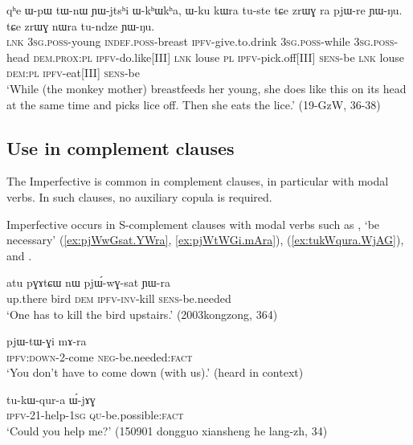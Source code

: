 \begin{exe}
\ex \label{ex:YWjtshi.WkhWkha}
\gll qʰe ɯ-pɯ tɯ-nɯ ɲɯ-jtsʰi ɯ-kʰɯkʰa,  ɯ-ku kɯra tu-ste tɕe zrɯɣ ra pjɯ-re ɲɯ-ŋu.  tɕe zrɯɣ nɯra tu-ndze ɲɯ-ŋu. \\
\textsc{lnk} \textsc{3sg}.\textsc{poss}-young \textsc{indef}.\textsc{poss}-breast \textsc{ipfv}-give.to.drink \textsc{3sg}.\textsc{poss}-while \textsc{3sg}.\textsc{poss}-head \textsc{dem}.\textsc{prox}:\textsc{pl} \textsc{ipfv}-do.like[III] \textsc{lnk} louse \textsc{pl} \textsc{ipfv}-pick.off[III] \textsc{sens}-be \textsc{lnk} louse \textsc{dem}:\textsc{pl} \textsc{ipfv}-eat[III] \textsc{sens}-be \\
\glt `While (the monkey mother) breastfeeds her young, she does like this on its head at the same time and picks lice off. Then she eats the lice.' (19-GzW, 36-38)
\end{exe}

\subsection{Use in complement clauses} \label{sec:ipfv.complement}
The Imperfective is common in complement clauses, in particular with modal verbs. In such clauses, no auxiliary copula is required.

Imperfective occurs in S-complement clauses with modal verbs such as , `be necessary' (\ref{ex:pjWwGsat.YWra}, \ref{ex:pjWtWGi.mAra}),  (\ref{ex:tukWqura.WjAG}),  and . 

\begin{exe}
\ex \label{ex:pjWwGsat.YWra}
\gll  atu pɣɤtɕɯ nɯ pjɯ́-wɣ-sat ɲɯ-ra \\
up.there bird \textsc{dem} \textsc{ipfv}-\textsc{inv}-kill \textsc{sens}-be.needed \\
\glt `One has to kill the bird upstairs.' (2003kongzong, 364)
\end{exe}

\begin{exe}
\ex \label{ex:pjWtWGi.mAra}
\gll pjɯ-tɯ-ɣi mɤ-ra \\
\textsc{ipfv}:\textsc{down}-2-come \textsc{neg}-be.needed:\textsc{fact} \\
\glt `You don't have to come down (with us).' (heard in context)
\end{exe}

\begin{exe}
\ex \label{ex:tukWqura.WjAG}
\gll tu-kɯ-qur-a ɯ́-jɤɣ \\
\textsc{ipfv}-2\fl{}1-help-\textsc{1sg} \textsc{qu}-be.possible:\textsc{fact} \\
\glt `Could you help me?' (150901 dongguo xiansheng he lang-zh, 34)
\end{exe}

